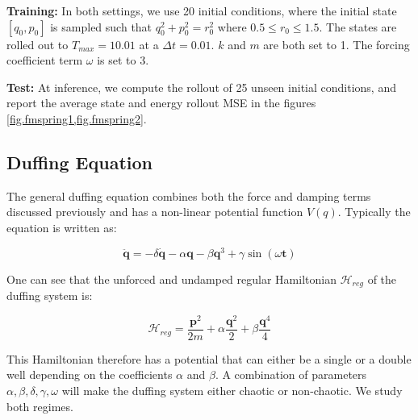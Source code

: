 \documentclass[twoside]{article}
\begin{document}
\textbf{Training:} In both settings, we use 20 initial conditions, where the initial state $[q_0,p_0]$ is sampled such that $q_0^2 +p_0^2 =r_0^2$ where $0.5 \leq r_0 \leq 1.5$. The states are rolled out to $T_{max}=10.01$ at a $\Delta t = 0.01$. $k$ and $m$ are both set to 1. The forcing coefficient term $\omega$ is set to 3. 

\textbf{Test:} At inference, we compute the rollout of 25 unseen initial conditions, and report the average state and energy rollout MSE in the figures \ref{fig.fmspring1,fig.fmspring2}.

\subsection{Duffing Equation}

The general duffing equation combines both the force and damping terms discussed previously and has a non-linear potential function $V(q)$. Typically the equation is written as:

\begin{equation}
\ddot{\mathbf{q}} = -\delta \dot{\mathbf{q}} -\alpha \mathbf{q} -\beta \mathbf{q}^3 +\gamma \sin(\omega \mathbf{t}) 
\end{equation}

One can see that the unforced and undamped regular Hamiltonian $\mathcal{H}_{reg}$ of the duffing system is:

\begin{equation}
\mathcal{H}_{reg} = \frac{\mathbf{p}^2}{2m}+ \alpha \frac{\mathbf{q}^2}{2} + \beta \frac{\mathbf{q}^4}{4}
\end{equation}

This Hamiltonian therefore has a potential that can either be a single or a double well depending on the coefficients $\alpha$ and $\beta$. A combination of parameters $\alpha,\beta,\delta,\gamma,\omega$ will make the duffing system either chaotic or non-chaotic. We study both regimes.
\end{document}

